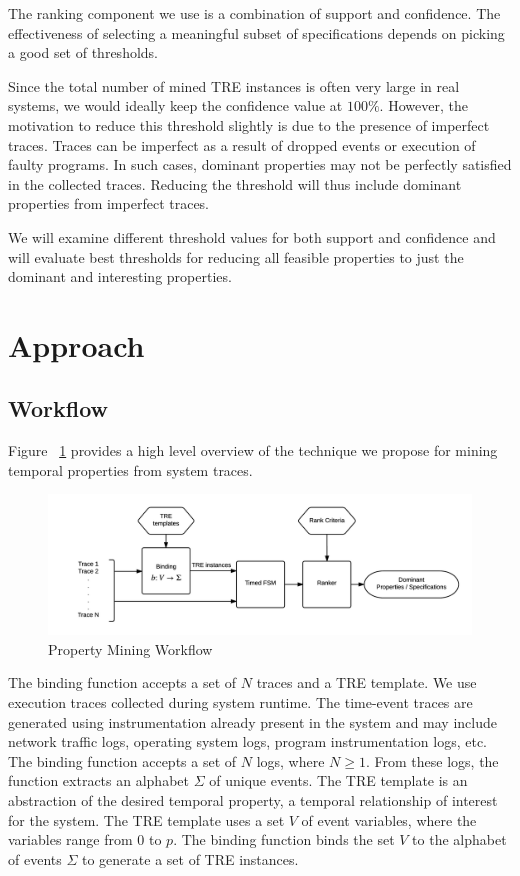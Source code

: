 \documentclass[]{sigplanconf}
\begin{document}
The ranking component we use is a combination of support and confidence. The effectiveness of selecting a meaningful subset of specifications depends on picking a good set of thresholds.

Since the total number of mined TRE instances is often very large in real systems, we would ideally keep the confidence value at $100 \%$. However, the motivation to reduce this threshold slightly is due to the presence of imperfect traces. Traces can be imperfect as a result of dropped events or execution of faulty programs. In such cases, dominant properties may not be perfectly satisfied in the collected traces. Reducing the threshold will thus include dominant properties from imperfect traces.

We will examine different threshold values for both support and confidence and will evaluate best thresholds for reducing all feasible properties to just the dominant and interesting properties.

\section{Approach} \label{Approach}

\subsection{Workflow}

Figure ~\ref{fig:approach} provides a high level overview of the technique we propose for mining temporal properties from system traces.

\begin{figure}[h]
  \centering
  \includegraphics[trim = 1cm 0cm 0cm 0cm,clip = true,width=\linewidth]{figures/Workflow.png}
  \caption{Property Mining Workflow}
  \label{fig:approach}
\end{figure}

The binding function accepts a set of $N$ traces and a TRE template. We use execution traces collected during system runtime. The time-event traces are generated using instrumentation already present in the system and may include network traffic logs, operating system logs, program instrumentation logs, etc. The binding function accepts a set of $N$ logs, where $N \ge 1$. From these logs, the function extracts an alphabet $\Sigma$ of unique events. The TRE template is an abstraction of the desired temporal property, a temporal relationship of interest for the system. The TRE template uses a set $V$ of event variables, where the variables range from $0$ to $p$. The binding function binds the set $V$ to the alphabet of events $\Sigma$ to generate a set of TRE instances.
\end{document}
